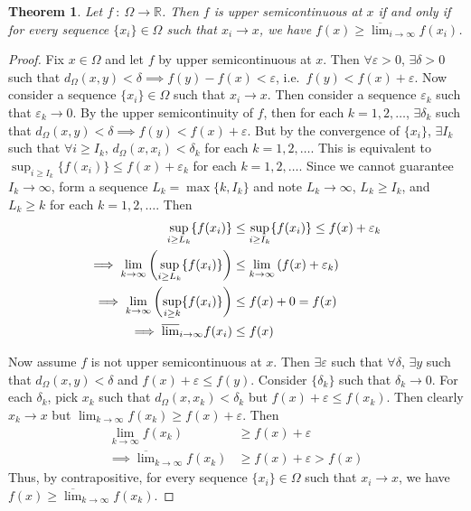 \documentclass[12pt]{article}
\theoremstyle{plain}
\newtheorem{theorem}{Theorem}
\begin{document}
\begin{theorem}
    Let $f\ :\ \Omega \rightarrow \mathbb{R}$.  Then $f$ is upper semicontinuous at $x$ if and only if for every sequence $\{x_i\} \in \Omega$ such that $x_i \rightarrow x$, we have $f(x) \geq \overline{\lim}_{i\rightarrow \infty}f(x_i)$.
\end{theorem}
\begin{proof}
    Fix $x \in \Omega$ and let $f$ by upper semicontinuous at $x$.  Then $\forall \varepsilon > 0$, $\exists \delta > 0$ such that $d_\Omega(x, y) < \delta \implies f(y) - f(x) < \varepsilon$, i.e.~$f(y) < f(x) + \varepsilon$.  Now consider a sequence $\{x_i\} \in \Omega$ such that $x_i \rightarrow x$.  Then consider a sequence $\varepsilon_k$ such that $\varepsilon_k \rightarrow 0$.  By the upper semicontinuity of $f$, then for each $k = 1, 2, \dots$, $\exists \delta_k$ such that $d_\Omega(x,y) < \delta \implies f(y) < f(x) + \varepsilon$.  But by the convergence of $\{x_i\}$, $\exists I_k$ such that $\forall i \geq I_k$, $d_\Omega(x, x_i) < \delta_k$ for each $k = 1, 2, \dots$.  This is equivalent to $\sup_{i \geq I_k}\{f(x_i)\} \leq f(x) + \varepsilon_k$ for each $k = 1, 2, \dots$.  Since we cannot guarantee $I_k \rightarrow \infty$, form a sequence $L_k = \max\{k, I_k\}$ and note $L_k \rightarrow \infty$, $L_k \geq I_k$, and $L_k \geq k$ for each $k = 1, 2, \dots$.  Then
    \begin{align*}
        \sup_{i \geq L_k}\{f(x_i)\} &\leq \sup_{i \geq I_k}\{f(x_i)\} \leq f(x) + \varepsilon_k \\
        \implies \lim_{k \rightarrow \infty}\qty(\sup_{i \geq L_k}\{f(x_i)\}) &\leq \lim_{k \rightarrow \infty} \qty(f(x) + \varepsilon_k) \\
        \implies \lim_{k \rightarrow \infty}\qty(\sup_{i \geq k}\{f(x_i)\}) &\leq f(x) + 0 = f(x) \\
        \implies \overline{\lim}_{i \rightarrow \infty} f(x_i) &\leq f(x)
    \end{align*}

    Now assume $f$ is not upper semicontinuous at $x$.  Then $\exists \varepsilon$ such that $\forall \delta$, $\exists y$ such that $d_\Omega(x,y) < \delta$ and $f(x) + \varepsilon \leq f(y)$.  Consider $\{\delta_k\}$ such that $\delta_k \rightarrow 0$.  For each $\delta_k$, pick $x_k$ such that $d_\Omega(x, x_k) < \delta_k$ but $f(x) + \varepsilon \leq f(x_k)$.  Then clearly $x_k \rightarrow x$ but $\lim_{k\rightarrow \infty} f(x_k) \geq f(x) + \varepsilon$.  Then
    \begin{align*}
        \lim_{k\rightarrow \infty} f(x_k) &\geq f(x) + \varepsilon \\
        \implies \overline{\lim}_{k \rightarrow \infty} f(x_k) &\geq f(x) + \varepsilon > f(x)
    \end{align*}
    Thus, by contrapositive, for every sequence $\{x_i\} \in \Omega$ such that $x_i \rightarrow x$, we have $f(x) \geq \overline{\lim}_{k \rightarrow \infty} f(x_k)$.
\end{proof}
\end{document}
